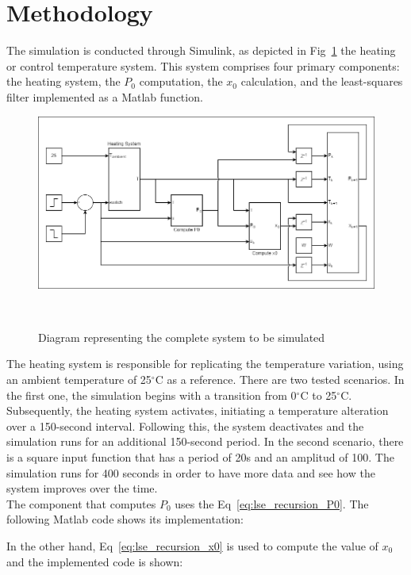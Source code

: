 \section{Methodology}
The simulation is conducted through Simulink, as depicted in Fig~\ref{fig:heat_system_diagram} the heating or control temperature system. This system comprises four primary components: the heating system, the $P_{0}$ computation, the $x_{0}$ calculation, and the least-squares filter implemented as a Matlab function.

\begin{figure}[H]
\centering
\includegraphics[width=1\linewidth]{figures/heat_system_diagram.png}
\caption{Diagram representing the complete system to be simulated}
~\label{fig:heat_system_diagram}
\end{figure}

The heating system is responsible for replicating the temperature variation, using an ambient temperature of 25$^{\circ}$C as a reference. There are two tested scenarios. In the first one, the simulation begins with a transition from 0$^{\circ}$C to 25$^{\circ}$C. Subsequently, the heating system activates, initiating a temperature alteration over a 150-second interval. Following this, the system deactivates and the simulation runs for an additional 150-second period. In the second scenario, there is a square input function that has a period of 20s and an amplitud of 100. The simulation runs for 400 seconds in order to have more data and see how the system improves over the time. \\

The component that computes $P_{0}$ uses the Eq~\ref{eq:lse_recursion_P0}. The following Matlab code shows its implementation:



In the other hand, Eq~\ref{eq:lse_recursion_x0} is used to compute the value of $x_{0}$ and the implemented code is shown:

